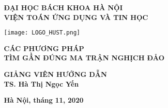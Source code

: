 \begin{titlepage}
    \thispagestyle{empty}
    \thisfancypage{
    \setlength{\fboxsep}{3pt}
    \fbox}{} 

    \begin{center}
    \vspace{3cm}
    {\bf\large ĐẠI HỌC BÁCH KHOA HÀ NỘI}\\
    {\bf VIỆN TOÁN ỨNG DỤNG VÀ TIN HỌC}\\[2cm]
    
    \begin{center}
        \texttt{[image: LOGO\_HUST.png]}
    \end{center}
    
    
    \vspace{2cm}
    {\bf\Large CÁC PHƯƠNG PHÁP}\\
    {\bf\Large TÌM GẦN ĐÚNG MA TRẬN NGHỊCH ĐẢO}\\
    
    \vspace{1cm}
    {\bf \AUTHOR}
    
    \vspace{1cm}
    {\bf GIẢNG VIÊN HƯỚNG DẪN}\\
    {\bf TS. Hà Thị Ngọc Yến}
    \end{center}
    
    \vspace{6cm}
    \begin{center}
    {\bf Hà Nội, tháng 11, 2020}
    \end{center}

\end{titlepage}